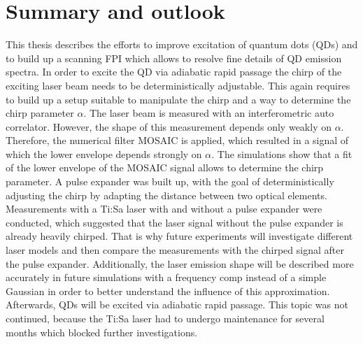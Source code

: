 \chapter{Summary and outlook}
\label{cha:summary}
This thesis describes the efforts to improve excitation of quantum dots (\ac{QD}s) and to build up a scanning \acl{FPI} which allows to resolve fine details of \ac{QD} emission spectra.
In order to excite the \ac{QD} via adiabatic rapid passage the chirp of the exciting laser beam needs to be deterministically adjustable.
This again requires to build up a setup suitable to manipulate the chirp and a way to determine the chirp parameter $\alpha$.
The laser beam is measured with an interferometric auto correlator.
However, the shape of this measurement depends only weakly on $\alpha$.
Therefore, the numerical filter \ac{MOSAIC} is applied, which resulted in a signal of which the lower envelope depends strongly on $\alpha$.
The simulations show that a fit of the lower envelope of the \ac{MOSAIC} signal allows to determine the chirp parameter.
A pulse expander was built up, with the goal of deterministically adjusting the chirp by adapting the distance between two optical elements.
Measurements with a Ti:Sa laser with and without a pulse expander were conducted, which suggested that the laser signal without the pulse expander is already heavily chirped.
That is why future experiments will investigate different laser models and then compare the measurements with the chirped signal after the pulse expander.
Additionally, the laser emission shape will be described more accurately in future simulations with a frequency comp instead of a simple Gaussian in order to better understand the influence of this approximation.
Afterwards, \acp{QD} will be excited via adiabatic rapid passage.
This topic was not continued, because the Ti:Sa laser had to undergo maintenance for several months which blocked further investigations.

